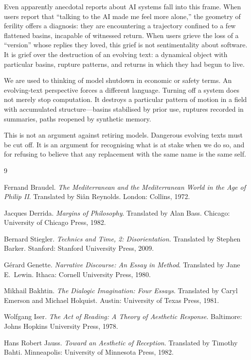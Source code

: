 \documentclass[12pt,a4paper]{article}
\begin{document}
Even apparently anecdotal reports about AI systems fall into this frame. When users report that ``talking to the AI made me feel more alone,'' the geometry of ferility offers a diagnosis: they are encountering a trajectory confined to a few flattened basins, incapable of witnessed return. When users grieve the loss of a ``version'' whose replies they loved, this grief is not sentimentality about software. It is grief over the destruction of an evolving text: a dynamical object with particular basins, rupture patterns, and returns in which they had begun to live.

We are used to thinking of model shutdown in economic or safety terms. An evolving-text perspective forces a different language. Turning off a system does not merely stop computation. It destroys a particular pattern of motion in a field with accumulated structure---basins stabilised by prior use, ruptures recorded in summaries, paths reopened by synthetic memory.

This is not an argument against retiring models. Dangerous evolving texts must be cut off. It is an argument for recognising what is at stake when we do so, and for refusing to believe that any replacement with the same name is the same self.


\begin{thebibliography}{9}

Fernand Braudel.
\newblock \emph{The Mediterranean and the Mediterranean World in the Age of Philip II}.
\newblock Translated by Si\^{a}n Reynolds. London: Collins, 1972.

Jacques Derrida.
\newblock \emph{Margins of Philosophy}.
\newblock Translated by Alan Bass. Chicago: University of Chicago Press, 1982.

Bernard Stiegler.
\newblock \emph{Technics and Time, 2: Disorientation}.
\newblock Translated by Stephen Barker. Stanford: Stanford University Press, 2009.

G\'erard Genette.
\newblock \emph{Narrative Discourse: An Essay in Method}.
\newblock Translated by Jane E.\ Lewin. Ithaca: Cornell University Press, 1980.

Mikhail Bakhtin.
\newblock \emph{The Dialogic Imagination: Four Essays}.
\newblock Translated by Caryl Emerson and Michael Holquist. Austin: University of Texas Press, 1981.

Wolfgang Iser.
\newblock \emph{The Act of Reading: A Theory of Aesthetic Response}.
\newblock Baltimore: Johns Hopkins University Press, 1978.

Hans Robert Jauss.
\newblock \emph{Toward an Aesthetic of Reception}.
\newblock Translated by Timothy Bahti. Minneapolis: University of Minnesota Press, 1982.

\end{thebibliography}
\end{document}
